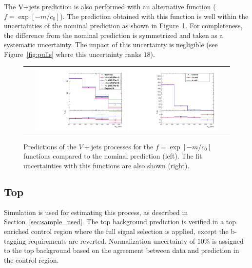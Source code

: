The $\mathrm{V}+$jets  prediction is also performed with an alternative function ($f=\exp\left[-m/c_{0}\right]$). The prediction obtained with this function is well within the uncertainties of the nominal prediction as shown in Figure~\ref{fig:wjet2}. For completeness, the difference from the nominal prediction is symmetrized and taken as a systematic uncertainty. The impact of this uncertainty is negligible (see Figure~\ref{fig:pulls} where this uncertainty ranks $18$).    

\begin{figure}[!htbp]
  \begin{center}
    \begin{tabular}{c}
    \includegraphics[width=0.45\textwidth]{Plots/systematic/WjetFit_all_log.pdf}%
    \includegraphics[width=0.45\textwidth]{Plots/systematic/WjetFitSyst_AlternateShape_Wjets.pdf}%
    \end{tabular}
    \caption{Predictions of the $V+$jets processes for the $f=\exp\left[-m/c_{0}\right]$ functions compared to the nominal prediction (left). The fit uncertainties with this functions are also shown (right).}
    \label{fig:wjet2}
  \end{center}
\end{figure}


\subsection{Top }
Simulation is used for estimating this process, as described in Section~\ref{sec:sample_used}. The top background prediction is verified in a top enriched control region where the full signal selection is applied, except the b-tagging requirements are reverted. Normalization uncertainty of $10\%$ is assigned to the top background based on the agreement between data and prediction in the control region. 


